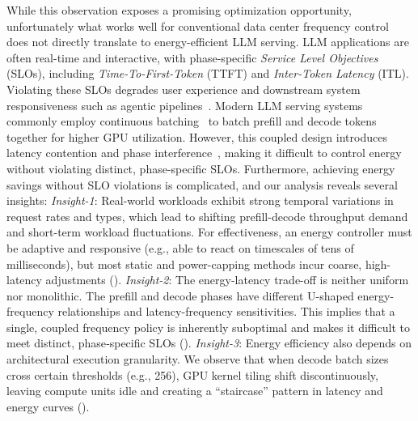 While this observation exposes a promising optimization opportunity, unfortunately what works well for conventional data center frequency control does not directly translate to energy-efficient LLM serving.
LLM applications are often real-time and interactive, with phase-specific \textit{Service Level Objectives} (SLOs), including \textit{Time-To-First-Token} (TTFT) and \textit{Inter-Token Latency} (ITL).
Violating these SLOs degrades user experience and downstream system responsiveness such as agentic pipelines~\cite{zhang2025webpilot}.
Modern LLM serving systems commonly employ continuous batching~\cite{yu2022orca} to batch prefill and decode tokens together for higher GPU utilization.
However, this coupled design introduces latency contention and phase interference~\cite{zhong2024distserve}, making it difficult to control energy without violating distinct, phase-specific SLOs.
Furthermore, achieving energy savings without SLO violations is complicated, and our analysis reveals several insights:
\emph{Insight-1}: Real-world workloads exhibit strong temporal variations in request rates and types, which lead to shifting prefill-decode throughput demand and short-term workload fluctuations.
For effectiveness, an energy controller must be adaptive and responsive (e.g., able to react on timescales of tens of milliseconds), but most static and power-capping methods incur coarse, high-latency adjustments ().
\emph{Insight-2}: The energy-latency trade-off is neither uniform nor monolithic.
The prefill and decode phases have different U-shaped energy-frequency relationships and latency-frequency sensitivities.
This implies that a single, coupled frequency policy is inherently suboptimal and makes it difficult to meet distinct, phase‑specific SLOs ().
\emph{Insight-3}: Energy efficiency also depends on architectural execution granularity.
We observe that when decode batch sizes cross certain thresholds (e.g., 256), GPU kernel tiling shift discontinuously, leaving compute units idle and creating a ``staircase'' pattern in latency and energy curves ().

